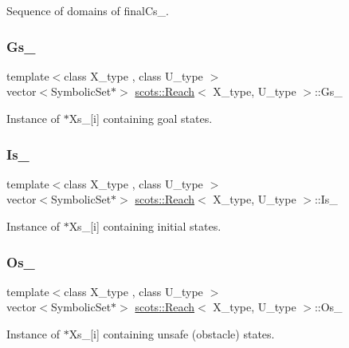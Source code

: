 Sequence of domains of final\+Cs\+\_\+. \mbox{\label{classscots_1_1Reach_af3fd5ddf192d97ec5dc650ad57e6c485}} 
\subsubsection{\texorpdfstring{Gs\+\_\+}{Gs\_}}
{\footnotesize\ttfamily template$<$class X\+\_\+type , class U\+\_\+type $>$ \\
vector$<$Symbolic\+Set$\ast$$>$ \hyperlink{classscots_1_1Reach}{scots\+::\+Reach}$<$ X\+\_\+type, U\+\_\+type $>$\+::Gs\+\_\+}

Instance of $\ast$\+Xs\+\_\+\mbox{[}i\mbox{]} containing goal states. \mbox{\label{classscots_1_1Reach_a3366767e4a2edbb8c683e0a74a709b10}} 
\subsubsection{\texorpdfstring{Is\+\_\+}{Is\_}}
{\footnotesize\ttfamily template$<$class X\+\_\+type , class U\+\_\+type $>$ \\
vector$<$Symbolic\+Set$\ast$$>$ \hyperlink{classscots_1_1Reach}{scots\+::\+Reach}$<$ X\+\_\+type, U\+\_\+type $>$\+::Is\+\_\+}

Instance of $\ast$\+Xs\+\_\+\mbox{[}i\mbox{]} containing initial states. \mbox{\label{classscots_1_1Reach_aaf92fe46eb13b4939c4bf350102135ce}} 
\subsubsection{\texorpdfstring{Os\+\_\+}{Os\_}}
{\footnotesize\ttfamily template$<$class X\+\_\+type , class U\+\_\+type $>$ \\
vector$<$Symbolic\+Set$\ast$$>$ \hyperlink{classscots_1_1Reach}{scots\+::\+Reach}$<$ X\+\_\+type, U\+\_\+type $>$\+::Os\+\_\+}

Instance of $\ast$\+Xs\+\_\+\mbox{[}i\mbox{]} containing unsafe (obstacle) states. \mbox{\label{classscots_1_1Reach_ade8c2425a8ff0cc7d7ed017412b6aa29}} 
